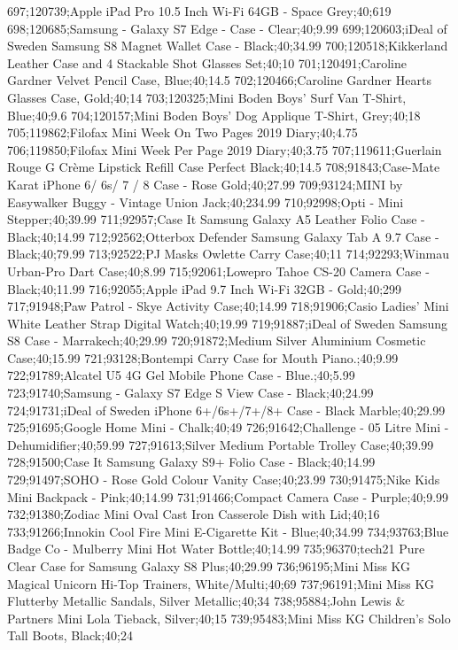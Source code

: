 697;120739;Apple iPad Pro 10.5 Inch Wi-Fi 64GB - Space Grey;40;619
698;120685;Samsung - Galaxy S7 Edge - Case - Clear;40;9.99
699;120603;iDeal of Sweden Samsung S8 Magnet Wallet Case - Black;40;34.99
700;120518;Kikkerland Leather Case and 4 Stackable Shot Glasses Set;40;10
701;120491;Caroline Gardner Velvet Pencil Case, Blue;40;14.5
702;120466;Caroline Gardner Hearts Glasses Case, Gold;40;14
703;120325;Mini Boden Boys' Surf Van T-Shirt, Blue;40;9.6
704;120157;Mini Boden Boys' Dog Applique T-Shirt, Grey;40;18
705;119862;Filofax Mini Week On Two Pages 2019 Diary;40;4.75
706;119850;Filofax Mini Week Per Page 2019 Diary;40;3.75
707;119611;Guerlain Rouge G Crème Lipstick Refill Case Perfect Black;40;14.5
708;91843;Case-Mate Karat iPhone 6/ 6s/ 7 / 8 Case - Rose Gold;40;27.99
709;93124;MINI by Easywalker Buggy - Vintage Union Jack;40;234.99
710;92998;Opti - Mini Stepper;40;39.99
711;92957;Case It Samsung Galaxy A5 Leather Folio Case - Black;40;14.99
712;92562;Otterbox Defender Samsung Galaxy Tab A 9.7 Case - Black;40;79.99
713;92522;PJ Masks Owlette Carry Case;40;11
714;92293;Winmau Urban-Pro Dart Case;40;8.99
715;92061;Lowepro Tahoe CS-20 Camera Case - Black;40;11.99
716;92055;Apple iPad 9.7 Inch Wi-Fi 32GB - Gold;40;299
717;91948;Paw Patrol - Skye Activity Case;40;14.99
718;91906;Casio Ladies' Mini White Leather Strap Digital Watch;40;19.99
719;91887;iDeal of Sweden Samsung S8 Case - Marrakech;40;29.99
720;91872;Medium Silver Aluminium Cosmetic Case;40;15.99
721;93128;Bontempi Carry Case for Mouth Piano.;40;9.99
722;91789;Alcatel U5 4G Gel Mobile Phone Case - Blue.;40;5.99
723;91740;Samsung - Galaxy S7 Edge S View Case - Black;40;24.99
724;91731;iDeal of Sweden iPhone 6+/6s+/7+/8+ Case - Black Marble;40;29.99
725;91695;Google Home Mini - Chalk;40;49
726;91642;Challenge - 05 Litre Mini - Dehumidifier;40;59.99
727;91613;Silver Medium Portable Trolley Case;40;39.99
728;91500;Case It Samsung Galaxy S9+ Folio Case - Black;40;14.99
729;91497;SOHO - Rose Gold Colour Vanity Case;40;23.99
730;91475;Nike Kids Mini Backpack - Pink;40;14.99
731;91466;Compact Camera Case - Purple;40;9.99
732;91380;Zodiac Mini Oval Cast Iron Casserole Dish with Lid;40;16
733;91266;Innokin Cool Fire Mini E-Cigarette Kit - Blue;40;34.99
734;93763;Blue Badge Co - Mulberry Mini Hot Water Bottle;40;14.99
735;96370;tech21 Pure Clear Case for Samsung Galaxy S8 Plus;40;29.99
736;96195;Mini Miss KG Magical Unicorn Hi-Top Trainers, White/Multi;40;69
737;96191;Mini Miss KG Flutterby Metallic Sandals, Silver Metallic;40;34
738;95884;John Lewis & Partners Mini Lola Tieback, Silver;40;15
739;95483;Mini Miss KG Children's Solo Tall Boots, Black;40;24
